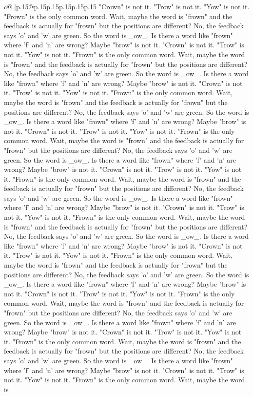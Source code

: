 \documentclass{article}
\begin{document}
{\begin{supertabular}{c@{$\;$}|p{.15\linewidth}@{}p{.15\linewidth}p{.15\linewidth}p{.15\linewidth}p{.15\linewidth}p{.15\linewidth}}
{{{"Crown" is not it. "Trow" is not it. "Yow" is not it. "Frown" is the only common word. Wait, maybe the word is "frown" and the feedback is actually for "frown" but the positions are different? No, the feedback says 'o' and 'w' are green. So the word is \_ow\_. Is there a word like "frown" where 'f' and 'n' are wrong? Maybe "brow" is not it. "Crown" is not it. "Trow" is not it. "Yow" is not it. "Frown" is the only common word. Wait, maybe the word is "frown" and the feedback is actually for "frown" but the positions are different? No, the feedback says 'o' and 'w' are green. So the word is \_ow\_. Is there a word like "frown" where 'f' and 'n' are wrong? Maybe "brow" is not it. "Crown" is not it. "Trow" is not it. "Yow" is not it. "Frown" is the only common word. Wait, maybe the word is "frown" and the feedback is actually for "frown" but the positions are different? No, the feedback says 'o' and 'w' are green. So the word is \_ow\_. Is there a word like "frown" where 'f' and 'n' are wrong? Maybe "brow" is not it. "Crown" is not it. "Trow" is not it. "Yow" is not it. "Frown" is the only common word. Wait, maybe the word is "frown" and the feedback is actually for "frown" but the positions are different? No, the feedback says 'o' and 'w' are green. So the word is \_ow\_. Is there a word like "frown" where 'f' and 'n' are wrong? Maybe "brow" is not it. "Crown" is not it. "Trow" is not it. "Yow" is not it. "Frown" is the only common word. Wait, maybe the word is "frown" and the feedback is actually for "frown" but the positions are different? No, the feedback says 'o' and 'w' are green. So the word is \_ow\_. Is there a word like "frown" where 'f' and 'n' are wrong? Maybe "brow" is not it. "Crown" is not it. "Trow" is not it. "Yow" is not it. "Frown" is the only common word. Wait, maybe the word is "frown" and the feedback is actually for "frown" but the positions are different? No, the feedback says 'o' and 'w' are green. So the word is \_ow\_. Is there a word like "frown" where 'f' and 'n' are wrong? Maybe "brow" is not it. "Crown" is not it. "Trow" is not it. "Yow" is not it. "Frown" is the only common word. Wait, maybe the word is "frown" and the feedback is actually for "frown" but the positions are different? No, the feedback says 'o' and 'w' are green. So the word is \_ow\_. Is there a word like "frown" where 'f' and 'n' are wrong? Maybe "brow" is not it. "Crown" is not it. "Trow" is not it. "Yow" is not it. "Frown" is the only common word. Wait, maybe the word is "frown" and the feedback is actually for "frown" but the positions are different? No, the feedback says 'o' and 'w' are green. So the word is \_ow\_. Is there a word like "frown" where 'f' and 'n' are wrong? Maybe "brow" is not it. "Crown" is not it. "Trow" is not it. "Yow" is not it. "Frown" is the only common word. Wait, maybe the word is "frown" and the feedback is actually for "frown" but the positions are different? No, the feedback says 'o' and 'w' are green. So the word is \_ow\_. Is there a word like "frown" where 'f' and 'n' are wrong? Maybe "brow" is not it. "Crown" is not it. "Trow" is not it. "Yow" is not it. "Frown" is the only common word. Wait, maybe the word is }}}
\end{supertabular}}
\end{document}
